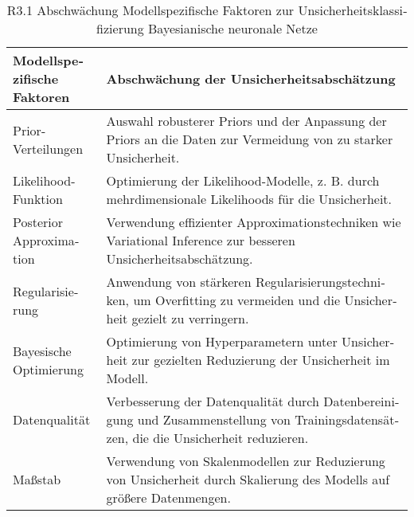 \begin{otherlanguage}{ngerman}
\begin{table}[!htpb]
  \centering
  \begin{tabularx}{\textwidth}{|l|X|}
    \hline
    \textbf{Modellspezifische Faktoren} & \textbf{Abschwächung der Unsicherheitsabschätzung} \\
    \hline
    Prior-Verteilungen & Auswahl robusterer Priors und der Anpassung der Priors an die Daten zur Vermeidung von zu starker Unsicherheit. \\
    \hline
    Likelihood-Funktion & Optimierung der Likelihood-Modelle, z. B. durch mehrdimensionale Likelihoods für die Unsicherheit. \\
    \hline
    Posterior Approximation & Verwendung effizienter Approximationstechniken wie Variational Inference zur besseren Unsicherheitsabschätzung. \\
    \hline
    Regularisierung & Anwendung von stärkeren Regularisierungstechniken, um Overfitting zu vermeiden und die Unsicherheit gezielt zu verringern. \\
    \hline
    Bayesische Optimierung & Optimierung von Hyperparametern unter Unsicherheit zur gezielten Reduzierung der Unsicherheit im Modell. \\
    \hline
    Datenqualität & Verbesserung der Datenqualität durch Datenbereinigung und Zusammenstellung von Trainingsdatensätzen, die die Unsicherheit reduzieren. \\
    \hline
    Maßstab & Verwendung von Skalenmodellen zur Reduzierung von Unsicherheit durch Skalierung des Modells auf größere Datenmengen. \\
    \hline
  \end{tabularx}
  \caption{R3.1 Abschwächung Modellspezifische Faktoren zur Unsicherheitsklassifizierung \gls{Bayesianische neuronale Netze}}\label{tab:chapter6r32}
\end{table}


\end{otherlanguage}
